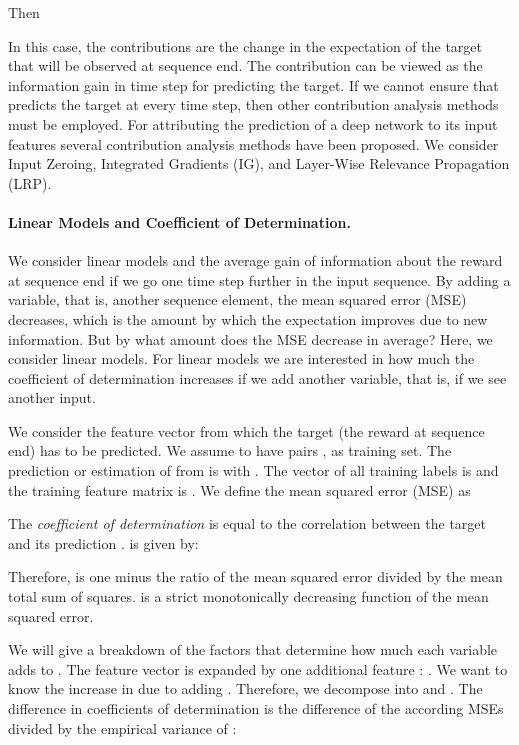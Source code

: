 \documentclass{article}
\begin{document}
\begin{appendices}
 
Then 
 
In this case, the contributions are the change in the expectation of 
the target that will be observed at sequence end.
The contribution can be viewed as the information gain in time step 
for predicting the target.
If we cannot ensure that  predicts the target at every time step,
then other contribution analysis methods must be employed.
For attributing the prediction of a deep
network to its input features several contribution analysis
methods have been proposed.
We consider Input Zeroing, 
Integrated Gradients (IG), and Layer-Wise Relevance Propagation (LRP).


\paragraph{Linear Models and Coefficient of Determination.}

We consider linear models and the average gain of information about
the reward at sequence end if we go one time step further in the 
input sequence.
By adding a variable, that is, another sequence element, the mean squared error (MSE)
decreases, which is the amount by which the expectation improves due to new information.
But by what amount does the MSE decrease in average? 
Here, we consider linear models.
For linear models we are interested in how much the coefficient of 
determination increases if we add another variable, that is, if we
see another input.

We consider the feature vector  from which
the target  (the reward at sequence end) has to be predicted. 
We assume to have  pairs ,
as training set. 
The prediction or estimation of  from  is  with 
. The vector of all training labels is  and
the training feature matrix is .
We define the mean squared error (MSE) as



The {\em coefficient of determination} 
is equal to the correlation between the target  and
its prediction .
 is given by:

Therefore,  is one minus the ratio of the mean squared
error divided by the mean total sum of squares.
 is a strict monotonically decreasing function of the
mean squared error.


We will give a breakdown of the factors that determine how much
each variable adds to  \cite[chapter 10.6, p.~263]{Rencher:08}.
The feature vector  is expanded by one additional feature :
.
We want to know the increase in  due to adding .
Therefore, we decompose  into  and .  
The difference in coefficients of determination is the difference 
of the according MSEs divided by the empirical variance of :



\end{appendices}
\end{document}
